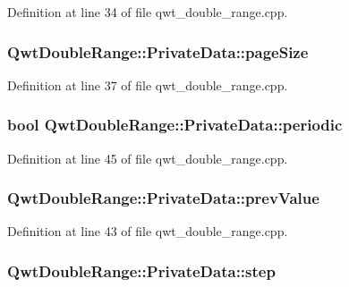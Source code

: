 Definition at line 34 of file qwt\-\_\-double\-\_\-range.\-cpp.

\hypertarget{class_qwt_double_range_1_1_private_data_a8a6da785f3d9aff2343a28aa3f1c5d68}{
\subsubsection[{page\-Size}]{ Qwt\-Double\-Range\-::\-Private\-Data\-::page\-Size}}\label{class_qwt_double_range_1_1_private_data_a8a6da785f3d9aff2343a28aa3f1c5d68}


Definition at line 37 of file qwt\-\_\-double\-\_\-range.\-cpp.

\hypertarget{class_qwt_double_range_1_1_private_data_a9e06bbcf42d2fb13e01d247f301e2cfb}{
\subsubsection[{periodic}]{\setlength{\rightskip}{0pt plus 5cm}bool Qwt\-Double\-Range\-::\-Private\-Data\-::periodic}}\label{class_qwt_double_range_1_1_private_data_a9e06bbcf42d2fb13e01d247f301e2cfb}


Definition at line 45 of file qwt\-\_\-double\-\_\-range.\-cpp.

\hypertarget{class_qwt_double_range_1_1_private_data_a2ae20126424bd931b39f75e5259ca96d}{
\subsubsection[{prev\-Value}]{ Qwt\-Double\-Range\-::\-Private\-Data\-::prev\-Value}}\label{class_qwt_double_range_1_1_private_data_a2ae20126424bd931b39f75e5259ca96d}


Definition at line 43 of file qwt\-\_\-double\-\_\-range.\-cpp.

\hypertarget{class_qwt_double_range_1_1_private_data_ad96d8e08db4866d74aec33ba5bcef4e1}{
\subsubsection[{step}]{ Qwt\-Double\-Range\-::\-Private\-Data\-::step}}\label{class_qwt_double_range_1_1_private_data_ad96d8e08db4866d74aec33ba5bcef4e1}



